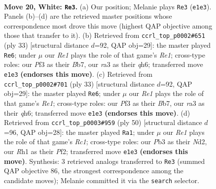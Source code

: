 \documentclass[11pt]{article}
\begin{document}
\clearpage

\begin{figure}[p]\centering
\begin{subfigure}{0.46\textwidth}\centering
\resizebox{\linewidth}{!}{%
\newchessgame
\chessboard[
  setfen={4kb1r/1p2pp1n/1B1p2p1/1b5p/3PP3/rP3P2/P4QPP/2K1R2R w k - 1 20},
  showmover=false,
  pgfstyle=straightmove, color=movearrow, markmove={e1-e3}
]}
\caption{}
\end{subfigure}\hfill
\begin{subfigure}{0.46\textwidth}\centering
\resizebox{\linewidth}{!}{%
\newchessgame
\chessboard[
  setfen={r2qr1k1/pbp2p2/1p3p1Q/4P3/3p4/P5P1/1P2PP1P/2R1KBR1 b - - 0 17},
  showmover=false,
  pgfstyle=straightmove, color=movearrow, markmove={e8-e6}
]}
\caption{}
\end{subfigure}
\\[4pt]
\begin{subfigure}{0.46\textwidth}\centering
\resizebox{\linewidth}{!}{%
\newchessgame
\chessboard[
  setfen={r2qr1k1/pbp2p2/1p3p1Q/4P3/3p4/P5P1/1P2PP1P/2R1KBR1 b - - 0 17},
  showmover=false,
  pgfstyle=straightmove, color=movearrow, markmove={e8-e6}
]}
\caption{}
\end{subfigure}\hfill
\begin{subfigure}{0.46\textwidth}\centering
\resizebox{\linewidth}{!}{%
\newchessgame
\chessboard[
  setfen={3q1rk1/2p2b1p/1pp3p1/r3p3/P3P3/2P1R2P/2QN1PP1/2R3K1 w - - 0 26},
  showmover=false,
  pgfstyle=straightmove, color=movearrow, markmove={c1-a1}
]}
\caption{}
\end{subfigure}
\caption{\textbf{Move 20, White: \texttt{Re3}.} (a) Our position; Melanie plays \texttt{Re3} (\texttt{e1e3}). Panels (b)--(d) are the retrieved master positions whose correspondence most drove this move (highest QAP objective among those that transfer to it). (b) Retrieved from \texttt{ccrl\_top\_p0002\#651} (ply 33) [structural distance $d$=92, QAP obj=29]: the master played \texttt{Re6}; under $\mu$ our \emph{Re1} plays the role of that game's \emph{Re1}; cross-type roles: our \emph{P}f3 as their \emph{B}b7, our \emph{r}a3 as their \emph{q}h6; transferred move \texttt{e1e3} \textbf{(endorses this move)}. (c) Retrieved from \texttt{ccrl\_top\_p0002\#701} (ply 33) [structural distance $d$=92, QAP obj=29]: the master played \texttt{Re6}; under $\mu$ our \emph{Re1} plays the role of that game's \emph{Re1}; cross-type roles: our \emph{P}f3 as their \emph{B}b7, our \emph{r}a3 as their \emph{q}h6; transferred move \texttt{e1e3} \textbf{(endorses this move)}. (d) Retrieved from \texttt{ccrl\_top\_p0003\#959} (ply 50) [structural distance $d$=96, QAP obj=28]: the master played \texttt{Ra1}; under $\mu$ our \emph{Re1} plays the role of that game's \emph{Rc1}; cross-type roles: our \emph{P}b3 as their \emph{N}d2, our \emph{R}h1 as their \emph{P}f2; transferred move \texttt{e1e3} \textbf{(endorses this move)}. Synthesis: 3 retrieved analogs transferred to \texttt{Re3} (summed QAP objective 86, the strongest correspondence among the candidate moves); Melanie committed it via the \texttt{search} selector.}
\label{fig:thought-m38}
\end{figure}
\end{document}

